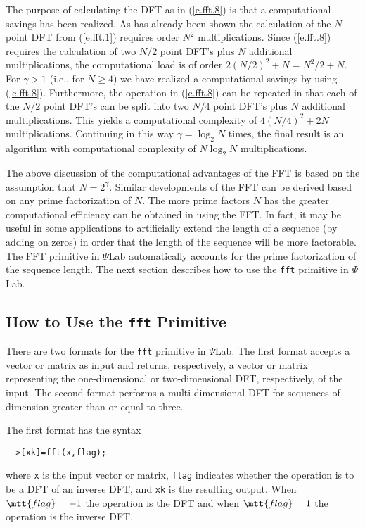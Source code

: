 	The purpose of calculating the DFT as in 
(\ref{e.fft.8}) is that a computational savings has been realized.
As has already been shown the calculation of the $N$ point DFT
from (\ref{e.fft.1}) requires order $N^2$ multiplications.  Since
(\ref{e.fft.8}) requires the calculation of two $N/2$ point DFT's
plus $N$ additional multiplications, the computational load
is of order $2(N/2)^2+N=N^2/2+N$.  For $\gamma>1$ 
(i.e., for $N\ge4$) we have realized a computational savings
by using (\ref{e.fft.8}).  Furthermore, the operation in (\ref{e.fft.8})
can be repeated in that each of the $N/2$ point
DFT's can be split into two $N/4$ point DFT's
plus $N$ additional multiplications.
This yields a computational complexity of $4(N/4)^2+2N$ multiplications.
Continuing in this way $\gamma=\log_2N$ times, the final result
is an algorithm with computational complexity of $N\log_2N$ multiplications.

	The above discussion of the computational advantages of the FFT
is based on the assumption that $N=2^{\gamma}$.  Similar developments
of the FFT can be derived based on any prime factorization of $N$.
The more prime factors $N$ has the greater computational efficiency
can be obtained in using the FFT.  In fact, it may be useful in some
applications to artificially extend the length of a sequence (by adding on
zeros) in order that the length of the sequence will be more factorable.
The FFT primitive in $\Psi$Lab automatically accounts for the prime
factorization of the sequence length.  The next section describes 
how to use the {\tt fft} primitive in $\Psi$Lab.

\subsection{How to Use the {\tt fft} Primitive}

	There are two formats for the {\tt fft} primitive in $\Psi$Lab.
The first format accepts a vector or matrix as input and returns,
respectively, a vector or matrix representing the one-dimensional
or two-dimensional  DFT, respectively, of the input.
The second format performs a multi-dimensional DFT for sequences of
dimension greater than or equal to three.  

	The first format has
the syntax
\begin{verbatim}
-->[xk]=fft(x,flag);
\end{verbatim}
where {\tt x} is the input vector or matrix, {\tt flag} indicates
whether the operation is to be a DFT of an inverse DFT, and {\tt xk}
is the resulting output.  When $\mtt{flag}=-1$ the operation is the DFT
and when $\mtt{flag}=1$ the operation is the inverse DFT.

